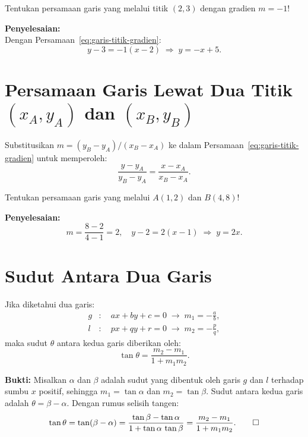 \begin{exmp}
Tentukan persamaan garis yang melalui titik $(2, 3)$ dengan gradien $m = -1$!

\textbf{Penyelesaian:}\\
Dengan Persamaan~\ref{eq:garis-titik-gradien}:
\[
y - 3 = -1(x - 2) \;\Longrightarrow\; y = -x + 5.
\]
\end{exmp}

\section{Persamaan Garis Lewat Dua Titik $(x_A, y_A)$ dan $(x_B, y_B)$}

Substitusikan $m = (y_B - y_A)/(x_B - x_A)$ ke dalam Persamaan~\ref{eq:garis-titik-gradien} untuk memperoleh:
\begin{equation}
\frac{y-y_A}{y_B - y_A} = \frac{x - x_A}{x_B - x_A}.
\end{equation}

\begin{exmp}
Tentukan persamaan garis yang melalui $A(1, 2)$ dan $B(4, 8)$!

\textbf{Penyelesaian:}\\
\[
m = \frac{8-2}{4-1} = 2, \quad y - 2 = 2(x - 1) \;\Longrightarrow\; y = 2x.
\]
\end{exmp}

\section{Sudut Antara Dua Garis}

Jika diketahui dua garis:
\begin{align*}
g&: \quad ax + by + c = 0 \;\rightarrow\; m_1= -\frac{a}{b}, \\
l&: \quad px + qy + r = 0 \;\rightarrow\; m_2= -\frac{p}{q},
\end{align*}
maka sudut $\theta$ antara kedua garis diberikan oleh:
\begin{equation}
\tan \theta = \frac{m_2 - m_1}{1+m_1 m_2}.
\end{equation}

\textbf{Bukti:} Misalkan $\alpha$ dan $\beta$ adalah sudut yang dibentuk oleh garis $g$ dan $l$ terhadap sumbu $x$ positif, sehingga $m_1 = \tan\alpha$ dan $m_2 = \tan\beta$. Sudut antara kedua garis adalah $\theta = \beta - \alpha$. Dengan rumus selisih tangen:
\[
\tan\theta = \tan(\beta - \alpha) = \frac{\tan\beta - \tan\alpha}{1 + \tan\alpha\,\tan\beta} = \frac{m_2 - m_1}{1 + m_1 m_2}. \qed
\]

